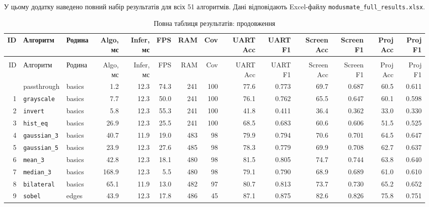 \clearpage
\noindent У цьому додатку наведено повний набір результатів для всіх 51 алгоритмів. Дані відповідають Excel-файлу \texttt{modusmate\_full\_results.xlsx}.
\begin{landscape}
\tiny
\setlength{\tabcolsep}{1.5pt}
\renewcommand{\arraystretch}{1.05}
\begin{longtable}{@{}r >{\raggedright\arraybackslash\ttfamily}p{2.8cm} >{\raggedright\arraybackslash}p{1.7cm} r r r r r r r r r r r@{}}
\caption{Повна таблиця результатів: часові, ресурсні та основні якісні метрики.}\label{tab:all_results_main}\\
\toprule
ID & Алгоритм & Родина & Algo, мс & Infer, мс & FPS & RAM & Cov & UART Acc & UART F1 & Screen Acc & Screen F1 & Proj Acc & Proj F1 \\
\midrule
\endfirsthead
\caption[]{Повна таблиця результатів: продовження}\\
\toprule
ID & Алгоритм & Родина & Algo, мс & Infer, мс & FPS & RAM & Cov & UART Acc & UART F1 & Screen Acc & Screen F1 & Proj Acc & Proj F1 \\
\midrule
\endhead
\bottomrule
\endfoot
0 & passthrough & basics & 1.2 & 12.3 & 74.3 & 241 & 100 & 77.6 & 0.773 & 69.7 & 0.687 & 60.5 & 0.611 \\
1 & \texttt{grayscale} & basics & 7.7 & 12.3 & 50.0 & 241 & 100 & 76.1 & 0.762 & 65.5 & 0.647 & 60.1 & 0.598 \\
2 & \texttt{invert} & basics & 5.8 & 12.3 & 55.3 & 241 & 100 & 41.8 & 0.411 & 36.4 & 0.362 & 33.0 & 0.330 \\
3 & \texttt{hist\_eq} & basics & 26.9 & 12.3 & 25.5 & 241 & 100 & 68.5 & 0.683 & 60.6 & 0.606 & 51.5 & 0.525 \\
4 & \texttt{gaussian\_3} & basics & 40.7 & 11.9 & 19.0 & 483 & 98 & 79.9 & 0.794 & 70.6 & 0.701 & 64.5 & 0.647 \\
5 & \texttt{gaussian\_5} & basics & 23.9 & 12.3 & 27.6 & 485 & 98 & 78.3 & 0.779 & 69.9 & 0.708 & 62.7 & 0.637 \\
6 & \texttt{mean\_3} & basics & 42.8 & 12.3 & 18.1 & 480 & 98 & 81.5 & 0.805 & 74.7 & 0.744 & 63.8 & 0.640 \\
7 & \texttt{median\_3} & basics & 168.9 & 12.3 & 5.5 & 480 & 98 & 79.1 & 0.790 & 68.9 & 0.689 & 61.0 & 0.610 \\
8 & \texttt{bilateral} & basics & 65.1 & 11.9 & 13.0 & 482 & 97 & 80.7 & 0.813 & 73.7 & 0.730 & 65.2 & 0.652 \\
9 & \texttt{sobel} & edges & 43.9 & 12.3 & 17.8 & 486 & 45 & 87.1 & 0.875 & 82.6 & 0.826 & 75.8 & 0.751 \\

\end{longtable}
\end{landscape}
